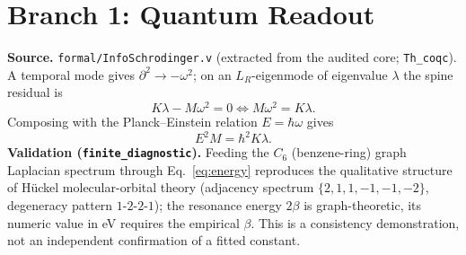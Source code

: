 \documentclass[10pt,twocolumn]{article}
\begin{document}
\section{Branch 1: Quantum Readout}
\label{sec:quantum}
\textbf{Source.} \texttt{formal/InfoSchrodinger.v} (extracted from the audited core;
\texttt{Th\_coqc}). A temporal mode gives $\partial^2\to-\omega^2$; on an
$L_R$-eigenmode of eigenvalue $\lambda$ the spine residual is
\begin{equation}
K\lambda - M\omega^2 = 0 \iff M\omega^2 = K\lambda.
\label{eq:dispersion}
\end{equation}
Composing with the Planck--Einstein relation $E=\hbar\omega$ \cite{planck1900,einstein1905a} gives
\begin{equation}
E^2 M = \hbar^2 K\lambda.
\label{eq:energy}
\end{equation}
\textbf{Validation (\texttt{finite\_diagnostic}).} Feeding the $C_6$ (benzene-ring)
graph Laplacian spectrum through Eq.~\ref{eq:energy} reproduces the qualitative
structure of H\"uckel molecular-orbital theory \cite{huckel1931} (adjacency spectrum
$\{2,1,1,-1,-1,-2\}$, degeneracy pattern $1$-$2$-$2$-$1$); the resonance energy
$2\beta$ is graph-theoretic, its numeric value in eV requires the empirical
$\beta$. This is a consistency demonstration, not an independent confirmation of a
fitted constant.
\end{document}
